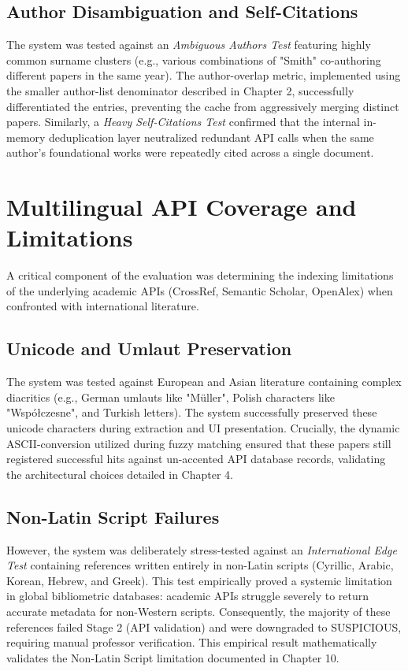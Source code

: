 \documentclass[12pt,a4paper,oneside]{report}
\begin{document}
\subsection{Author Disambiguation and Self-Citations}
The system was tested against an \textit{Ambiguous Authors Test} featuring highly common surname clusters (e.g., various combinations of "Smith" co-authoring different papers in the same year). The author-overlap metric, implemented using the smaller author-list denominator described in Chapter 2, successfully differentiated the entries, preventing the cache from aggressively merging distinct papers. Similarly, a \textit{Heavy Self-Citations Test} confirmed that the internal in-memory deduplication layer neutralized redundant API calls when the same author's foundational works were repeatedly cited across a single document.

\section{Multilingual API Coverage and Limitations}

A critical component of the evaluation was determining the indexing limitations of the underlying academic APIs (CrossRef, Semantic Scholar, OpenAlex) when confronted with international literature.

\subsection{Unicode and Umlaut Preservation}
The system was tested against European and Asian literature containing complex diacritics (e.g., German umlauts like "Müller", Polish characters like "Współczesne", and Turkish letters). The system successfully preserved these unicode characters during extraction and UI presentation. Crucially, the dynamic ASCII-conversion utilized during fuzzy matching ensured that these papers still registered successful hits against un-accented API database records, validating the architectural choices detailed in Chapter 4.

\subsection{Non-Latin Script Failures}
However, the system was deliberately stress-tested against an \textit{International Edge Test} containing references written entirely in non-Latin scripts (Cyrillic, Arabic, Korean, Hebrew, and Greek). This test empirically proved a systemic limitation in global bibliometric databases: academic APIs struggle severely to return accurate metadata for non-Western scripts. Consequently, the majority of these references failed Stage 2 (API validation) and were downgraded to SUSPICIOUS, requiring manual professor verification. This empirical result mathematically validates the Non-Latin Script limitation documented in Chapter 10.
\end{document}
